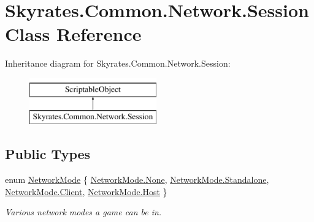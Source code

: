 \hypertarget{class_skyrates_1_1_common_1_1_network_1_1_session}{\section{Skyrates.\-Common.\-Network.\-Session Class Reference}
\label{class_skyrates_1_1_common_1_1_network_1_1_session}
}
Inheritance diagram for Skyrates.\-Common.\-Network.\-Session\-:\begin{figure}[H]
\begin{center}
\leavevmode
\includegraphics[height=2.000000cm]{class_skyrates_1_1_common_1_1_network_1_1_session}
\end{center}
\end{figure}
\subsection*{Public Types}
\begin{DoxyCompactItemize}
\item 
enum \hyperlink{class_skyrates_1_1_common_1_1_network_1_1_session_ad2f4973bc77af540bd68a428e349fbff}{Network\-Mode} \{ \hyperlink{class_skyrates_1_1_common_1_1_network_1_1_session_ad2f4973bc77af540bd68a428e349fbffa6adf97f83acf6453d4a6a4b1070f3754}{Network\-Mode.\-None}, 
\hyperlink{class_skyrates_1_1_common_1_1_network_1_1_session_ad2f4973bc77af540bd68a428e349fbffa5c80f101108a356211fcb26b3f83eabb}{Network\-Mode.\-Standalone}, 
\hyperlink{class_skyrates_1_1_common_1_1_network_1_1_session_ad2f4973bc77af540bd68a428e349fbffa577d7068826de925ea2aec01dbadf5e4}{Network\-Mode.\-Client}, 
\hyperlink{class_skyrates_1_1_common_1_1_network_1_1_session_ad2f4973bc77af540bd68a428e349fbffac2ca16d048ec66e04bca283eab048ec2}{Network\-Mode.\-Host}
 \}
\begin{DoxyCompactList}\small\item\em Various network modes a game can be in. \end{DoxyCompactList}\end{DoxyCompactItemize}
